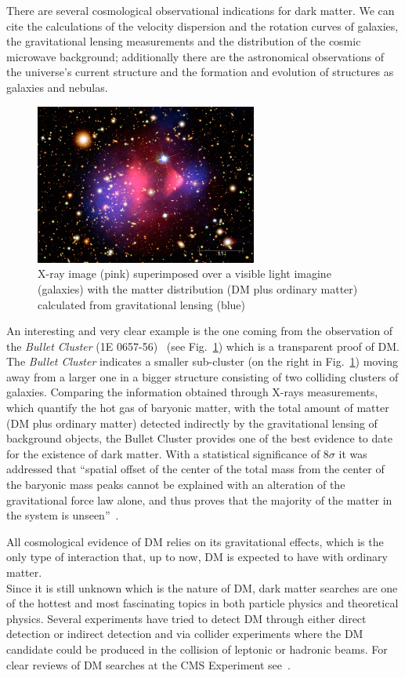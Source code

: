 There are several cosmological observational indications for dark matter. We can cite the calculations of the velocity dispersion and the rotation curves of galaxies, the gravitational lensing measurements and the distribution of the cosmic microwave background; additionally there are the astronomical observations of the universe's current structure and the formation and evolution of structures as galaxies and nebulas.\\
\begin{figure}[h]
\centering
\includegraphics[width=0.65\textwidth]{Figures/c1/bullet.jpg}
\caption{X-ray image (pink) superimposed over a visible light imagine (galaxies) with the matter distribution (DM plus ordinary matter) calculated from gravitational lensing (blue)~\cite{webpage_bullet}}
\label{fig:bullet}
\end{figure}
An interesting and very clear example is the one coming from the observation of the \emph{Bullet Cluster} (1E 0657-56)~\cite{Clowe_2004} (see Fig.~\ref{fig:bullet}) which is a transparent proof of DM. The \emph{Bullet Cluster} indicates a smaller sub-cluster (on the right in Fig.~\ref{fig:bullet}) moving away from a larger one in a bigger structure consisting of two colliding clusters of galaxies. Comparing the information obtained through X-rays measurements, which quantify the hot gas of baryonic matter, with the total amount of matter (DM plus ordinary matter) detected indirectly by the gravitational lensing of background objects, the Bullet Cluster provides 
one of the best evidence to date for the existence of dark matter. With a statistical significance of 8$\sigma$ it was addressed that ``spatial offset of the center of the total mass from the center of the baryonic mass peaks cannot be explained with an alteration of the gravitational force law alone, and thus proves that the majority of the matter in the system is unseen''~\cite{Clowe_2006}.

All cosmological evidence of DM relies on its gravitational effects, which is the only type of interaction that, up to now, DM is expected to have with ordinary matter.\\
Since it is still unknown which is the nature of DM, dark matter searches are one of the hottest and most fascinating  topics in both particle physics and theoretical physics. Several experiments have tried to detect DM through either direct detection or indirect detection and via collider experiments where the DM candidate could be produced in the collision of leptonic or hadronic beams. For clear reviews of DM searches at the CMS Experiment see~\cite{LOWETTE2016503,Bhawna_Gomber}.

